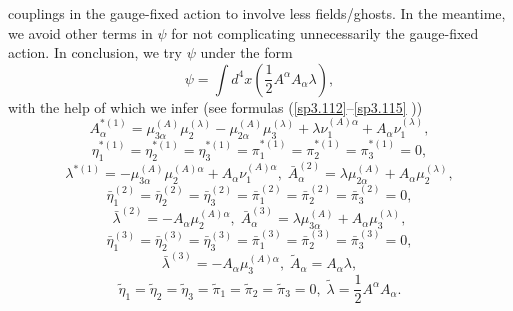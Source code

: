 \documentclass[a4paper,12pt]{article}
\begin{document}
couplings in the gauge-fixed action to involve less fields/ghosts. In the
meantime, we avoid other terms in $\psi $ for not complicating unnecessarily
the gauge-fixed action. In conclusion, we try $\psi $ under the form 
\begin{equation}
\psi =\int d^{4}x\left( \frac{1}{2}A^{\alpha }A_{\alpha }\lambda \right) ,
\label{sp3.e27}
\end{equation}
with the help of which we infer (see formulas (\ref{sp3.112}--\ref{sp3.115}%
)) 
\begin{equation}
A_{\alpha }^{*(1)}=\mu _{3\alpha }^{(A)}\mu _{2}^{(\lambda )}-\mu _{2\alpha
}^{(A)}\mu _{3}^{(\lambda )}+\lambda \nu _{1}^{(A)\alpha }+A_{\alpha }\nu
_{1}^{(\lambda )},  \label{sp3.e28}
\end{equation}
\begin{equation}
\eta _{1}^{*(1)}=\eta _{2}^{*(1)}=\eta _{3}^{*(1)}=\pi _{1}^{*(1)}=\pi
_{2}^{*(1)}=\pi _{3}^{*(1)}=0,  \label{sp3.e29}
\end{equation}
\begin{equation}
\lambda ^{*(1)}=-\mu _{3\alpha }^{(A)}\mu _{2}^{(A)\alpha }+A_{\alpha }\nu
_{1}^{(A)\alpha },\;\bar{A}_{\alpha }^{(2)}=\lambda \mu _{2\alpha
}^{(A)}+A_{\alpha }\mu _{2}^{(\lambda )},  \label{sp3.e30}
\end{equation}
\begin{equation}
\bar{\eta}_{1}^{(2)}=\bar{\eta}_{2}^{(2)}=\bar{\eta}_{3}^{(2)}=\bar{\pi}%
_{1}^{(2)}=\bar{\pi}_{2}^{(2)}=\bar{\pi}_{3}^{(2)}=0,  \label{sp3.e31}
\end{equation}
\begin{equation}
\bar{\lambda}^{(2)}=-A_{\alpha }\mu _{2}^{(A)\alpha },\;\bar{A}_{\alpha
}^{(3)}=\lambda \mu _{3\alpha }^{(A)}+A_{\alpha }\mu _{3}^{(\lambda )},
\label{sp3.e32}
\end{equation}
\begin{equation}
\bar{\eta}_{1}^{(3)}=\bar{\eta}_{2}^{(3)}=\bar{\eta}_{3}^{(3)}=\bar{\pi}%
_{1}^{(3)}=\bar{\pi}_{2}^{(3)}=\bar{\pi}_{3}^{(3)}=0,  \label{sp3.e33}
\end{equation}
\begin{equation}
\bar{\lambda}^{(3)}=-A_{\alpha }\mu _{3}^{(A)\alpha },\;\tilde{A}_{\alpha
}=A_{\alpha }\lambda ,  \label{sp3.e34}
\end{equation}
\begin{equation}
\tilde{\eta}_{1}=\tilde{\eta}_{2}=\tilde{\eta}_{3}=\tilde{\pi}_{1}=\tilde{\pi%
}_{2}=\tilde{\pi}_{3}=0,\;\tilde{\lambda}=\frac{1}{2}A^{\alpha }A_{\alpha }.
\label{sp3.e35}
\end{equation}
\end{document}
